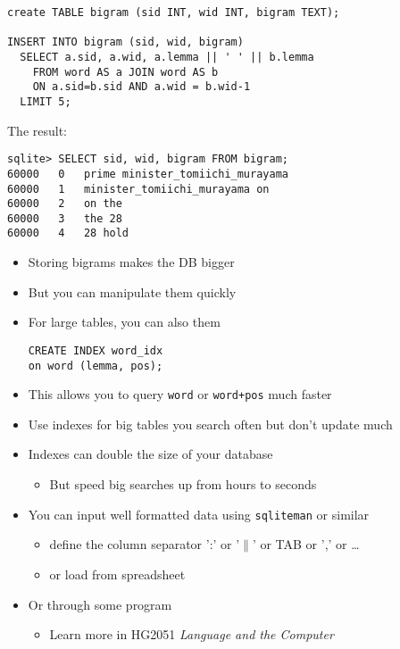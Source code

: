 \documentclass[a4paper,landscape,headrule,footrule,xetex]{foils}
\begin{document}

\begin{verbatim}
create TABLE bigram (sid INT, wid INT, bigram TEXT);

INSERT INTO bigram (sid, wid, bigram) 
  SELECT a.sid, a.wid, a.lemma || ' ' || b.lemma  
    FROM word AS a JOIN word AS b 
    ON a.sid=b.sid AND a.wid = b.wid-1 
  LIMIT 5;
\end{verbatim}

The result:

\begin{verbatim}
sqlite> SELECT sid, wid, bigram FROM bigram;
60000	0	prime minister_tomiichi_murayama
60000	1	minister_tomiichi_murayama on
60000	2	on the
60000	3	the 28
60000	4	28 hold
\end{verbatim}

\begin{itemize}
\item Storing bigrams makes the DB bigger
\item But you can manipulate them quickly
\item For large tables, you can also  them
\begin{verbatim}
CREATE INDEX word_idx
on word (lemma, pos);
\end{verbatim}
\item This allows you to query \texttt{word} or \texttt{word+pos} much faster
\item Use indexes for big tables you search often but don't update much
\item Indexes can double the size of your database
  \begin{itemize}
  \item But speed big searches up from hours to seconds
  \end{itemize}


\end{itemize}


\begin{itemize}
\item You can input well formatted data using \texttt{sqliteman} or similar
  \begin{itemize}
  \item define the column separator ':' or '$\|$' or TAB or ',' or \ldots
  \item or load from spreadsheet
  \end{itemize}
\item Or through some program
  \begin{itemize}
  \item Learn more in HG2051 \textit{Language and the Computer}
  \end{itemize}
\end{itemize}
\end{document}
